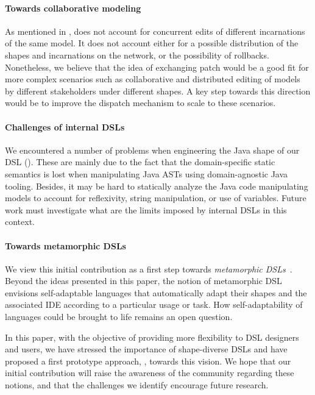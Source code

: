 \paragraph{Towards collaborative modeling}
As mentioned in , \prism does not account for concurrent edits of different incarnations of the same model.
It does not account either for a possible distribution of the shapes and incarnations on the network, or the possibility of rollbacks.
Nonetheless, we believe that the idea of exchanging patch would be a good fit for more complex scenarios such as collaborative and distributed editing of models by different stakeholders under different shapes.
A key step towards this direction would be to improve the dispatch mechanism to scale to these scenarios.

\paragraph{Challenges of internal DSLs}
We encountered a number of problems when engineering the Java shape of our DSL ().
These are mainly due to the fact that the domain-specific static semantics is lost when manipulating Java ASTs using domain-agnostic Java tooling.
Besides, it may be hard to statically analyze the Java code manipulating models to account for reflexivity, string manipulation, or use of variables.
Future work must investigate what are the limits imposed by internal DSLs in this context.


\paragraph{Towards metamorphic DSLs}
We view this initial contribution as a first step towards \emph{metamorphic DSLs}~\cite{acher2014metamorphic}.
Beyond the ideas presented in this paper, the notion of metamorphic DSL envisions self-adaptable languages that automatically adapt their shapes and the associated IDE according to a particular usage or task.
How self-adaptability of languages could be brought to life remains an open question.

\vspace{1em}
In this paper, with the objective of providing more flexibility to DSL designers and users, we have stressed the importance of shape-diverse DSLs and have proposed a first prototype approach, \prism, towards this vision.
We hope that our initial contribution will raise the awareness of the community regarding these notions, and that the challenges we identify encourage future research.
